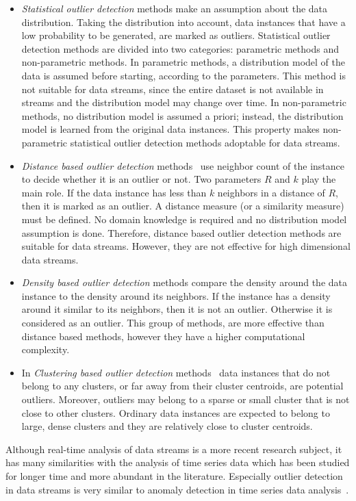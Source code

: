 \documentclass[smallcondensed]{svjour3}     %
\begin{document}
\begin{itemize}
	\item \textit{Statistical outlier detection} methods make an assumption about the data distribution. Taking the distribution into account, data instances that have a low probability to be generated, are marked as outliers. Statistical outlier detection methods are divided into two categories: parametric methods and non-parametric methods. In parametric methods, a distribution model of the data is assumed before starting, according to the parameters. This method is not suitable for data streams, since the entire dataset is not available in streams and the distribution model may change over time. In non-parametric methods, no distribution model is assumed a priori; instead, the distribution model is learned from the original data instances. This property makes non-parametric statistical outlier detection methods adoptable for data streams.
	\item \textit{Distance based outlier detection} methods~\citep{Chauhan2015outlier} use neighbor count of the instance to decide whether it is an outlier or not. Two parameters $R$ and $k$ play the main role. If the data instance has less than $k$ neighbors in a distance of $R$, then it is marked as an outlier. A distance measure (or a similarity measure) must be defined. No domain knowledge is required and no distribution model assumption is done. Therefore, distance based outlier detection methods are suitable for data streams. However, they are not effective for high dimensional data streams. 
	\item \textit{Density based outlier detection} methods compare the density around the data instance to the density around its neighbors. If the instance has a density around it similar to its neighbors, then it is not an outlier. Otherwise it is considered as an outlier. This group of methods, are more effective than distance based methods, however they have a higher computational complexity. 
	\item In \textit{Clustering based outlier detection} methods~\citep{Bhosale2014outlier} data instances that do not belong to any clusters, or far away from their cluster centroids, are potential outliers. Moreover, outliers may belong to a sparse or small cluster that is not close to other clusters. Ordinary data instances are expected to belong to large, dense clusters and they are relatively close to cluster centroids.
\end{itemize}

Although real-time analysis of data streams is a more recent research subject, it has many similarities with the analysis of time series data which has been studied for longer time and more abundant in the literature. Especially outlier detection in data streams is very similar to anomaly detection in time series data analysis~\citep{Kong2019timeseries, Christodoulou2018timeseries, Keogh2005timeseries}.
%
\end{document}
